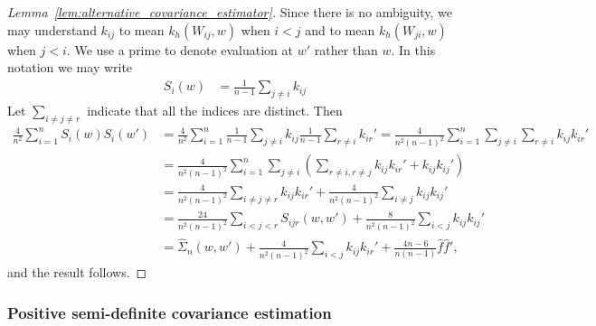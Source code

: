 \begin{proof}[Lemma~\ref{lem:alternative_covariance_estimator}]

  Since there is no ambiguity,
  we may understand
  $k_{ij}$
  to mean $k_h(W_{ij},w)$
  when $i<j$
  and
  to mean $k_h(W_{ji},w)$
  when $j<i$.
  We use a prime
  to denote evaluation at $w'$
  rather than $w$.
  In this notation we may write
  \begin{align*}
    S_i(w)
    &=
    \frac{1}{n-1}
    \sum_{j \neq i}
    k_{ij}
  \end{align*}
  Let $\sum_{i \neq j \neq r}$
  indicate that all the indices are distinct.
  Then
  \begin{align*}
    \frac{4}{n^2}
    \sum_{i=1}^n
    S_i(w) S_i(w')
    &=
    \frac{4}{n^2}
    \sum_{i=1}^n
    \frac{1}{n-1}
    \sum_{j \neq i}
    k_{ij}
    \frac{1}{n-1}
    \sum_{r \neq i}
    k_{ir}'
    =
    \frac{4}{n^2(n-1)^2}
    \sum_{i=1}^n
    \sum_{j \neq i}
    \sum_{r \neq i}
    k_{ij}
    k_{ir}' \\
    &=
    \frac{4}{n^2(n-1)^2}
    \sum_{i=1}^n
    \sum_{j \neq i}
    \left(
      \sum_{r \neq i, r \neq j}
      k_{ij}
      k_{ir}'
      + k_{ij}
      k_{ij}'
    \right) \\
    &=
    \frac{4}{n^2(n-1)^2}
    \sum_{i \neq j \neq r}
    k_{ij}
    k_{ir}'
    + \frac{4}{n^2(n-1)^2}
    \sum_{i \neq j}
    k_{ij}
    k_{ij}' \\
    &=
    \frac{24}{n^2(n-1)^2}
    \sum_{i < j < r}
    S_{ijr}(w,w')
    + \frac{8}{n^2(n-1)^2}
    \sum_{i < j}
    k_{ij}
    k_{ij}' \\
    &=
    \hat \Sigma_n(w,w')
    + \frac{4}{n^2(n-1)^2}
    \sum_{i < j}
    k_{ij}
    k_{ir}'
    + \frac{4n-6}{n(n-1)}
    \hat f
    \hat f',
  \end{align*}
  and the result follows.
\end{proof}

\subsubsection{Positive semi-definite covariance estimation}

